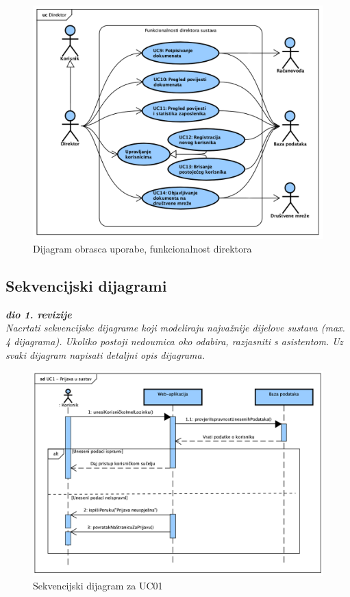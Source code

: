 					\begin{figure}[H]
						\includegraphics[width=\textwidth]{slike/UseCase_Direktor.png}
						\caption{Dijagram obrasca uporabe, funkcionalnost direktora}
						\label{fig:usecase_direktor}
					\end{figure}
				\eject{}
				
			\subsection{Sekvencijski dijagrami}
				
				\textbf{\textit{dio 1. revizije}}\\
				
				\textit{Nacrtati sekvencijske dijagrame koji modeliraju najvažnije dijelove sustava (max. 4 dijagrama). Ukoliko postoji nedoumica oko odabira, razjasniti s asistentom. Uz svaki dijagram napisati detaljni opis dijagrama.}

				\begin{figure}[H]
						\includegraphics[width=\textwidth]{slike/Sequence_UC01.png}
						\caption{Sekvencijski dijagram za UC01}
						\label{fig:sequence_UC01}
					\end{figure}

